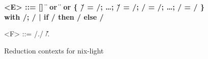 \begin{figure}
  \begin{grammar}
    \bfseries
    <E> ::= [] \| 
    \alt {} \|  or  \|  \|  or 
    \alt \{ \v/ = \e/; \ldots{}; \v/ = \e/; \E/ = \e/; \ldots{}; \e/ = \e/ \}
    \alt with \E/; \e/ | if \E/ then \e/ else \e/

    <F> ::= \E/.\a/ \| \v/.
  \end{grammar}
  \caption{Reduction contexts for nix-light\label{fig:semantics:nix-light:reduction-contexts}}
\end{figure}
